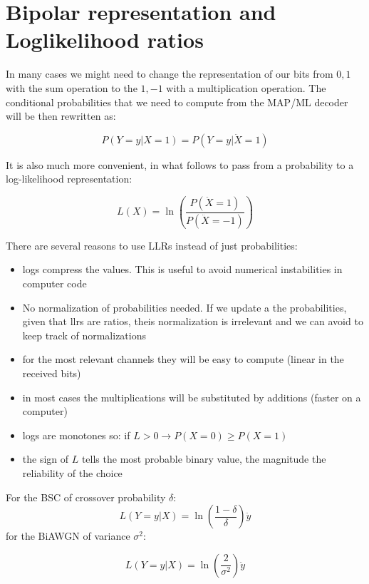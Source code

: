 \section{Bipolar representation and Loglikelihood ratios}

In many cases we might need to change the representation of our bits from ${0, 1}$ with the sum operation to the ${1, -1}$ with a multiplication operation. The conditional probabilities that we need to compute from the MAP/ML decoder will be then rewritten as:

\begin{equation}
	P(Y=y | X = 1) = P(Y=y | \ddot{X} = 1)
\end{equation}

It is also much more convenient, in what follows to pass from a probability to a log-likelihood representation:

\begin{equation}
	L(X) = \ln\left(\frac{P(\ddot{X} = 1)}{P(\ddot{X} = -1)}\right)
\end{equation}

There are several reasons to use LLRs instead of just probabilities:
\begin{itemize}
	\item logs compress the values. This is useful to avoid numerical instabilities in computer code
	\item No normalization of probabilities needed. If we update a the probabilities, given that llrs are ratios, theis normalization is irrelevant and we can avoid to keep track of normalizations
	\item for the most relevant channels they will be easy to compute (linear in the received bits)
	\item in most cases the multiplications will be substituted by additions (faster on a computer)
	\item logs are monotones so: if $L > 0 \rightarrow P(X=0) \ge P(X=1)$
	\item the sign of $L$ tells the most probable binary value, the magnitude the reliability of the choice
\end{itemize}

\begin{example}
For the BSC of crossover probability $\delta$: 
\begin{equation}
	L(Y=y|X) = \ln\left(\frac{1-\delta}{\delta}\right) \ddot{y}
\end{equation}
for the BiAWGN of variance $\sigma^2$:

\begin{equation}
	L(Y=y|X) = \ln \left(\frac{2}{\sigma^2}\right)\ddot{y}
\end{equation}

\end{example}

